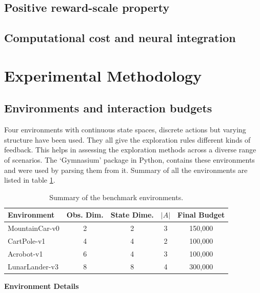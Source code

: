 \documentclass[preprint,12pt]{elsarticle}
\begin{document}
\subsection{Positive reward-scale property}


\subsection{Computational cost and neural integration}


\section{Experimental Methodology}
\subsection{Environments and interaction budgets}
Four environments with continuous state spaces, discrete actions but varying structure have been used. They all give the exploration rules different kinds of feedback. This helps in assessing the exploration methods across a diverse range of scenarios. The `Gymnasium' package in Python, contains these environments and were used by parsing them from it. Summary of all the environments are listed in table \ref{tab:environments}. 

\begin{table}[H]
    \centering
    \caption{Summary of the benchmark environments.}
    \label{tab:environments}
    \renewcommand{\arraystretch}{1.15}
    \setlength{\tabcolsep}{7pt}

    \begin{tabular}{lcccc}
        \toprule
        \textbf{Environment} &
        \textbf{Obs. Dim.} &
        \textbf{State Dime.} &
        \textbf{$|A|$} &
        \textbf{Final Budget} \\
        \midrule

        MountainCar-v0 & 2 & 2 & 3 & 150,000 \\
        CartPole-v1    & 4 & 4 & 2 & 100,000 \\
        Acrobot-v1     & 6 & 4 & 3 & 100,000 \\
        LunarLander-v3 & 8 & 8 & 4 & 300,000 \\

        \bottomrule
    \end{tabular}
\end{table}

\noindent\textbf{Environment Details}
\end{document}
